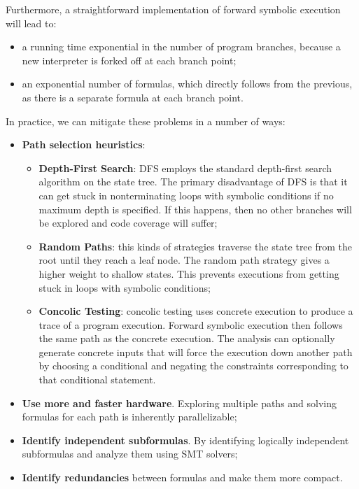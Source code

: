 Furthermore, a straightforward implementation of forward symbolic execution will lead to:
\begin{itemize}
	\item a running time exponential in the number of program branches, because a new interpreter is forked off at each branch point;
	\item an exponential number of formulas, which directly follows from the previous, as there is a separate formula at each branch point.
\end{itemize}
In practice, we can mitigate these problems in a number of ways:
\begin{itemize}
	\item \textbf{Path selection heuristics}:
	\begin{itemize}
		\item \textbf{Depth-First Search}: DFS employs the standard depth-first search algorithm on the state tree. The primary disadvantage of DFS is that it can get stuck in nonterminating loops with symbolic conditions if no maximum depth is specified. If this happens, then no other branches will be explored and code coverage will suffer;
		\item \textbf{Random Paths}: this kinds of strategies traverse the state tree from the root until they reach a leaf node. The random path strategy gives a higher weight to shallow states. This prevents executions from getting stuck in loops with symbolic conditions;
		\item \textbf{Concolic Testing}: concolic testing uses concrete execution to produce a trace of a program execution. Forward symbolic execution then follows the same path as the concrete execution. The analysis can optionally generate concrete inputs that will force the execution down another path by choosing a conditional and negating the constraints corresponding to that conditional statement.
	\end{itemize}
	\item \textbf{Use more and faster hardware}. Exploring multiple paths and solving formulas for each path is inherently parallelizable;
	\item \textbf{Identify independent subformulas}. By identifying logically independent subformulas and analyze them using SMT solvers;
	\item \textbf{Identify redundancies} between formulas and make them more compact.
\end{itemize}